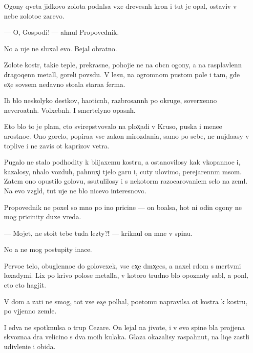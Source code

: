 \documentclass[10pt]{book}
\begin{document}
Ogony qveta jidkovo zolota podn{\ia}lsa v{\yi}xe drevesn{\yi}h kron i tut je opal, ostaviv v nebe zoloto{\y}e zarevo.

— O, Gospodi! — ahnul Propovednik.

No {\y}a uje ne sluxal {\y}evo. Bejal obratno.



Zolot{\yi}{\y}e kostr{\yi}, taki{\y}e tepl{\yi}{\y}e, prekrasn{\yi}{\y}e, pohoji{\y}e ne na ob{\yi}cn{\yi}{\y} ogony, a na rasplavlenn{\yi}{\y} dragoqenn{\yi}{\y} metall, goreli povs{\iu}du. V lesu, na ogromnom pustom pole i tam, gde {\y}ex̨e sovsem nedavno sto{\y}ala stara{\y}a ferma.

Ih b{\yi}lo neskolyko des{\ia}tkov, haoticn{\yi}h, razbrosann{\yi}h po okruge, soverxenno nevero{\y}atn{\yi}h. Volxebn{\yi}h. I smertelyno opasn{\yi}h.

Eto b{\yi}lo to je plam{\ia}, cto svirepstvovalo na plox̨adi v Kruso, puska{\y} i mene{\y}e {\y}arostno{\y}e. Ono gorelo, popira{\y}a vse zakon{\yi} mirozdani{\y}a, samo po sebe, ne nujda{\y}asy v toplive i ne zavis{\ia} ot kaprizov vetra.

Pugalo ne stalo podhodity k blija{\y}xemu kostru, a ostanovilosy kak vkopanno{\y}e i, kazalosy, n{\iu}halo vozduh, pahnux̨i{\y} t{\ia}jelo{\y} gar{\y}u i, cuty ulovimo, perejarenn{\yi}m m{\ia}som. Zatem ono opustilo golovu, ssutulilosy i s nekotor{\yi}m razocarovani{\y}em selo na zeml{\iu}. Na {\y}evo vzgl{\ia}d, tut uje ne b{\yi}lo nicevo interesnovo.

Propovednik ne poxel so mno{\y} po ino{\y} pricine — on bo{\y}alsa, hot{\ia} ni odin ogony ne mog pricinity duxe vreda.

— Mojet, ne sto{\y}it tebe tuda lezty?! — kriknul on mne v spinu.

No {\y}a ne mog postupity inace.

Pervo{\y}e telo, obuglenno{\y}e do golovexek, vse {\y}ex̨e d{\yi}m{\ia}x̨e{\y}es{\ia}, {\y}a naxel r{\ia}dom s mertv{\yi}mi loxadymi. Lix po krivo{\y} polose metalla, v kotoro{\y} trudno b{\yi}lo opoznaty sabl{\iu}, {\y}a pon{\ia}l, cto eto hagjit.

V dom {\y}a za{\y}ti ne smog, tot vse {\y}ex̨e pol{\yi}hal, poetomu napravilsa ot kostra k kostru, po v{\yi}jjenno{\y} zemle.

I {\y}edva ne spotknulsa o trup Cezare. On lejal na jivote, i v {\y}evo spine b{\yi}la projjena skvozna{\y}a d{\yi}ra velicino{\y} s dva mo{\y}ih kulaka. Glaza okazalisy raspahnut{\yi}, na liqe zast{\yi}li udivleni{\y}e i obida.
\end{document}
